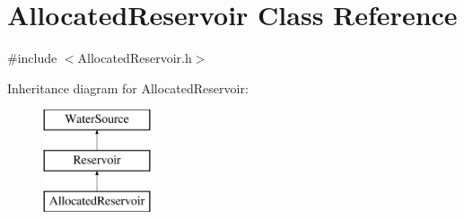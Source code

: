 \hypertarget{classAllocatedReservoir}{}\section{Allocated\+Reservoir Class Reference}
\label{classAllocatedReservoir}


{\ttfamily \#include $<$Allocated\+Reservoir.\+h$>$}

Inheritance diagram for Allocated\+Reservoir\+:\begin{figure}[H]
\begin{center}
\leavevmode
\includegraphics[height=3.000000cm]{classAllocatedReservoir}
\end{center}
\end{figure}
